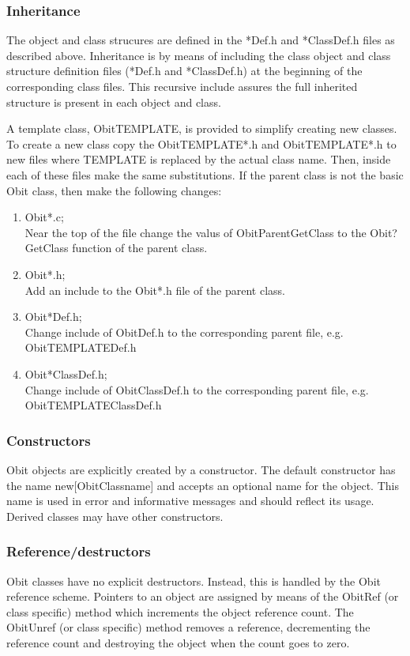 \documentclass[11pt]{article}
\begin{document}
\subsubsection{Inheritance}
The object and class strucures are defined in the *Def.h and
*ClassDef.h files as described above.
Inheritance is by means of including the class object and class
structure definition files (*Def.h and *ClassDef.h) at the beginning
of the corresponding class files.
This recursive include assures the full inherited structure is present
in each object and class.

   A template class, ObitTEMPLATE, is provided to simplify creating
new classes.
To create a new class copy the ObitTEMPLATE*.h and ObitTEMPLATE*.h to
new files where TEMPLATE is replaced by the actual class name.
Then, inside each of these files make the same substitutions.
If the parent class is not the basic Obit class, then make the
following changes:
\begin{enumerate}
\item Obit*.c;\\
Near the top of the file change the valus of ObitParentGetClass to
the Obit?GetClass function of the parent class.
\item Obit*.h;\\
Add an include to the Obit*.h file of the parent class.
\item Obit*Def.h;\\
Change include of ObitDef.h to the corresponding parent file,
e.g. ObitTEMPLATEDef.h
\item Obit*ClassDef.h;\\
Change include of ObitClassDef.h to the corresponding parent file,
e.g. ObitTEMPLATEClassDef.h
\end{enumerate}

\subsubsection{Constructors}
Obit objects are explicitly created by a constructor.
The default constructor has the name new[ObitClassname] and accepts an
optional name for the object.
This name is used in error and informative messages and should reflect
its usage.
Derived classes may have other constructors.

\subsubsection{Reference/destructors}
Obit classes have no explicit destructors.
Instead, this is handled by the Obit reference scheme.
Pointers to an object are assigned by means of the ObitRef (or class
specific) method which increments the object reference count.
The ObitUnref (or class specific) method removes a reference,
decrementing the reference count and destroying the object when the
count goes to zero.
\end{document}
